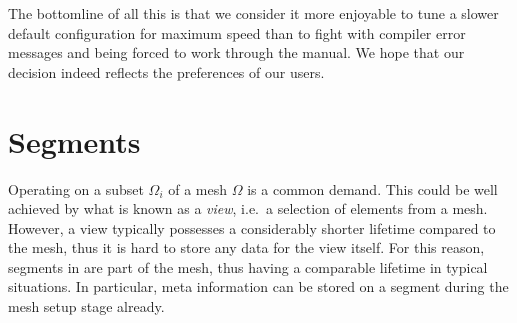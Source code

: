 The bottomline of all this is that we consider it more enjoyable to tune a slower default configuration for maximum speed than to fight with compiler error messages and being forced to work through the manual. We hope that our decision indeed reflects the preferences of our users.


 \section{Segments}
 Operating on a subset $\Omega_i$ of a mesh $\Omega$ is a common demand. This could be well achieved by what is known as a \emph{view}, i.e.~a selection of elements from a mesh. However, a view typically possesses a considerably shorter lifetime compared to the mesh, thus it is hard to store any data for the view itself.
 For this reason, segments in {\ViennaGrid} are part of the mesh, thus having a comparable lifetime in typical situations.
 In particular, meta information can be stored on a segment during the mesh setup stage already.
